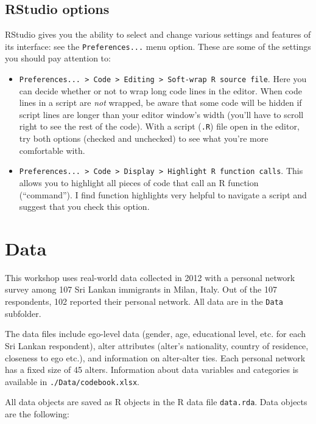 \documentclass[
]{book}
\providecommand{\tightlist}{%
  \setlength{\itemsep}{0pt}\setlength{\parskip}{0pt}}
\begin{document}
\hypertarget{rstudio-options}{%
\subsection{RStudio options}\label{rstudio-options}}

RStudio gives you the ability to select and change various settings and features of its interface: see the \texttt{Preferences...} menu option. These are some of the settings you should pay attention to:

\begin{itemize}
\tightlist
\item
  \texttt{Preferences...\ \textgreater{}\ Code\ \textgreater{}\ Editing\ \textgreater{}\ Soft-wrap\ R\ source\ file}. Here you can decide whether or not to wrap long code lines in the editor. When code lines in a script are \emph{not} wrapped, be aware that some code will be hidden if script lines are longer than your editor window's width (you'll have to scroll right to see the rest of the code). With a script (\texttt{.R}) file open in the editor, try both options (checked and unchecked) to see what you're more comfortable with.
\item
  \texttt{Preferences...\ \textgreater{}\ Code\ \textgreater{}\ Display\ \textgreater{}\ Highlight\ R\ function\ calls}. This allows you to highlight all pieces of code that call an R function (``command''). I find function highlights very helpful to navigate a script and suggest that you check this option.
\end{itemize}

\hypertarget{data}{%
\section{Data}\label{data}}

This workshop uses real-world data collected in 2012 with a personal network survey among 107 Sri Lankan immigrants in Milan, Italy. Out of the 107 respondents, 102 reported their personal network. All data are in the \texttt{Data} subfolder.

The data files include ego-level data (gender, age, educational level, etc. for each Sri Lankan respondent), alter attributes (alter's nationality, country of residence, closeness to ego etc.), and information on alter-alter ties. Each personal network has a fixed size of 45 alters. Information about data variables and categories is available in \texttt{./Data/codebook.xlsx}.

All data objects are saved as R objects in the R data file \texttt{data.rda}. Data objects are the following:
\end{document}
